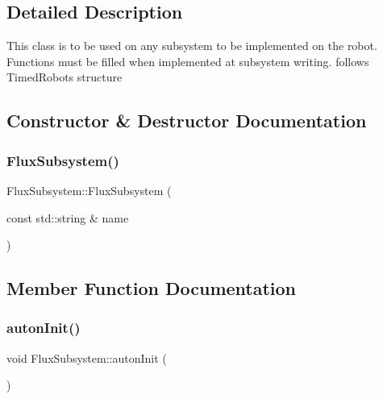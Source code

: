 \subsection{Detailed Description}
This class is to be used on any subsystem to be implemented on the robot. Functions must be filled when implemented at subsystem writing. follows Timed\+Robot\textquotesingle{}s structure 

\subsection{Constructor \& Destructor Documentation}
\mbox{\label{classFluxSubsystem_ae1c7aa86576c8b74db9283df11f556d0}} 
\subsubsection{\texorpdfstring{Flux\+Subsystem()}{FluxSubsystem()}}
{\footnotesize\ttfamily Flux\+Subsystem\+::\+Flux\+Subsystem (\begin{DoxyParamCaption}\item[{const std\+::string \&}]{name }\end{DoxyParamCaption})\hspace{0.3cm}{\ttfamily [explicit]}}



\subsection{Member Function Documentation}
\mbox{\label{classFluxSubsystem_a142cb34f612412e26bd0049e037dbe60}} 
\subsubsection{\texorpdfstring{auton\+Init()}{autonInit()}}
{\footnotesize\ttfamily void Flux\+Subsystem\+::auton\+Init (\begin{DoxyParamCaption}{ }\end{DoxyParamCaption})\hspace{0.3cm}{\ttfamily [virtual]}}



